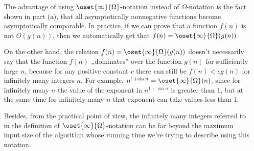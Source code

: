 The advantage of using $\oset{\infty}{\Omega}$-notation instead of $\Omega$-notation is the fact shown in part (a), that all asymptotically nonnegative functions become asymptotically comparable.
In practice, if we can prove that a function $f(n)$ is not $O(g(n))$, then we automatically get that $f(n)=\oset{\infty}{\Omega}(g(n))$.

On the other hand, the relation $f(n)=\oset{\infty}{\Omega}(g(n))$ doesn't necessarily say that the function $f(n)$ ,,dominates'' over the function $g(n)$ for sufficiently large $n$, because for any positive constant $c$ there can still be $f(n)<cg(n)$ for infinitely many integers $n$.
For example, $n^{1+\sin n}=\oset{\infty}{\Omega}(n)$, since for infinitely many $n$ the value of the exponent in $n^{1+\sin n}$ is greater than 1, but at the same time for infinitely many $n$ that exponent can take values less than 1.

Besides, from the practical point of view, the infinitely many integers referred to in the definition of $\oset{\infty}{\Omega}$-notation can be far beyond the maximum input size of the algorithm whose running time we're trying to describe using this notation.

